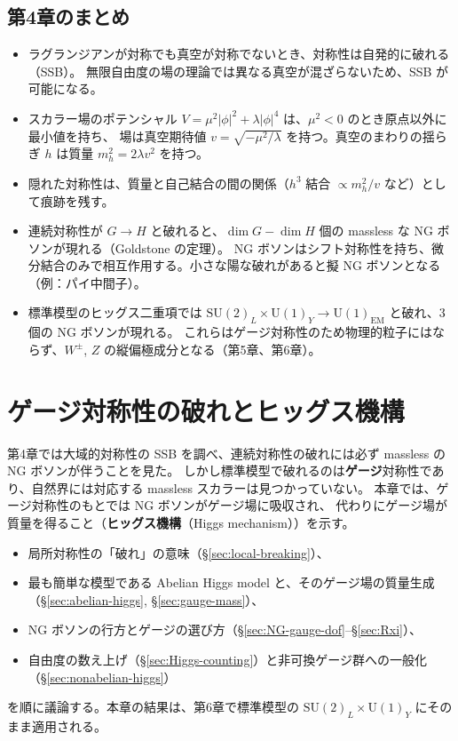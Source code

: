 \documentclass[uplatex,dvipdfmx,a4paper,11pt,openany]{jsbook}
\newcommand{\term}[2]{\textbf{#1}（#2）}
\numberwithin{equation}{chapter}
\theoremstyle{definition}
\theoremstyle{plain}
\theoremstyle{remark}
\newcommand{\SU}{\mathrm{SU}}
\newcommand{\U}{\mathrm{U}}
\begin{document}
\section*{第4章のまとめ}
\begin{itemize}
    \item ラグランジアンが対称でも真空が対称でないとき、対称性は自発的に破れる（SSB）。
    無限自由度の場の理論では異なる真空が混ざらないため、SSB が可能になる。
    \item スカラー場のポテンシャル $V=\mu^2|\phi|^2+\lambda|\phi|^4$ は、$\mu^2<0$ のとき原点以外に最小値を持ち、
    場は真空期待値 $v=\sqrt{-\mu^2/\lambda}$ を持つ。真空のまわりの揺らぎ $h$ は質量 $m_h^2=2\lambda v^2$ を持つ。
    \item 隠れた対称性は、質量と自己結合の間の関係（$h^3$ 結合 $\propto m_h^2/v$ など）として痕跡を残す。
    \item 連続対称性が $G\to H$ と破れると、$\dim G-\dim H$ 個の massless な NG ボソンが現れる（Goldstone の定理）。
    NG ボソンはシフト対称性を持ち、微分結合のみで相互作用する。小さな陽な破れがあると擬 NG ボソンとなる（例：パイ中間子）。
    \item 標準模型のヒッグス二重項では $\SU(2)_L\times\U(1)_Y\to\U(1)_{\mathrm{EM}}$ と破れ、3個の NG ボソンが現れる。
    これらはゲージ対称性のため物理的粒子にはならず、$W^\pm$, $Z$ の縦偏極成分となる（第5章、第6章）。
\end{itemize}
\chapter{ゲージ対称性の破れとヒッグス機構}
\label{ch:Higgs-mechanism}
第4章では大域的対称性の SSB を調べ、連続対称性の破れには必ず massless の NG ボソンが伴うことを見た。
しかし標準模型で破れるのは\textbf{ゲージ}対称性であり、自然界には対応する massless スカラーは見つかっていない。
本章では、ゲージ対称性のもとでは NG ボソンがゲージ場に吸収され、
代わりにゲージ場が質量を得ること（\term{ヒッグス機構}{Higgs mechanism}）を示す。
\begin{itemize}
    \item 局所対称性の「破れ」の意味（\S\ref{sec:local-breaking}）、
    \item 最も簡単な模型である Abelian Higgs model と、そのゲージ場の質量生成（\S\ref{sec:abelian-higgs}, \S\ref{sec:gauge-mass}）、
    \item NG ボソンの行方とゲージの選び方（\S\ref{sec:NG-gauge-dof}--\S\ref{sec:Rxi}）、
    \item 自由度の数え上げ（\S\ref{sec:Higgs-counting}）と非可換ゲージ群への一般化（\S\ref{sec:nonabelian-higgs}）
\end{itemize}
を順に議論する。本章の結果は、第6章で標準模型の $\SU(2)_L\times\U(1)_Y$ にそのまま適用される。
\end{document}
